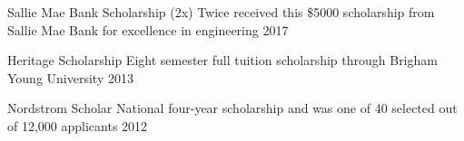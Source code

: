 \begin{cvhonors}
  \cvhonor
    {Sallie Mae Bank Scholarship (2x)} %
    {Twice received this \$5000 scholarship from Sallie Mae Bank for excellence in engineering} %
    {} %
    {2017} %
    
  \cvhonor
    {Heritage Scholarship} %
    {Eight semester full tuition scholarship through Brigham Young University} %
    {} %
    {2013} %
    
  \cvhonor
    {Nordstrom Scholar} %
    {National four-year scholarship and was one of 40 selected out of 12,000 applicants} %
    {} %
    {2012} %
    



\end{cvhonors}




